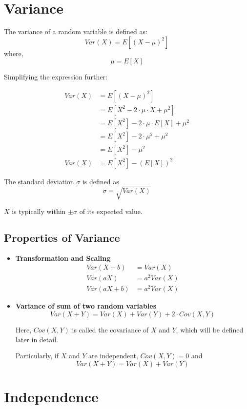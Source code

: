\documentclass[twoside]{article}
\begin{document}
\section{Variance}

The variance of a random variable is defined as:
\[
   Var(X) = E[(X - \mu)^2]
\]
where,
\[
   \mu = E[X]
\]

Simplifying the expression further:

\begin{align*}
   Var(X) &= E[ (X - \mu)^2 ] \\
   &= E[X^2 - 2 \cdot \mu \cdot X + \mu^2] \\
   &= E[X^2] - 2 \cdot \mu \cdot E[X] + \mu^2 \\
   &= E[X^2] - 2 \cdot \mu^2 + \mu^2 \\ 
   &= E[X^2] - \mu^2 \\ 
   Var(X) &= E[X^2] - (E[X])^2
\end{align*}

The standard deviation $\sigma$ is defined as
\[
   \sigma = \sqrt{Var(X)}
\]

$X$ is typically within $\pm \sigma$ of its expected value.

\subsection{Properties of Variance}

\begin{itemize}
   \item{\bf Transformation and Scaling}
   \begin{align*}
      Var(X + b) &= Var(X) \\
      Var(aX) &= a^2Var(X) \\
      Var(aX+b) &= a^2Var(X)
   \end{align*}

   \item{\bf Variance of sum of two random variables}
   \[
      Var(X + Y) = Var(X) + Var(Y) + 2 \cdot Cov(X, Y)
   \]

   Here, $Cov(X, Y)$ is called the covariance of $X$ and $Y$, which will be defined later in detail.

   Particularly, if $X$ and $Y$ are independent, $Cov(X, Y) = 0$ and
   \[
      Var(X + Y) = Var(X) + Var(Y)
   \]
\end{itemize}

\section{Independence}
\end{document}
